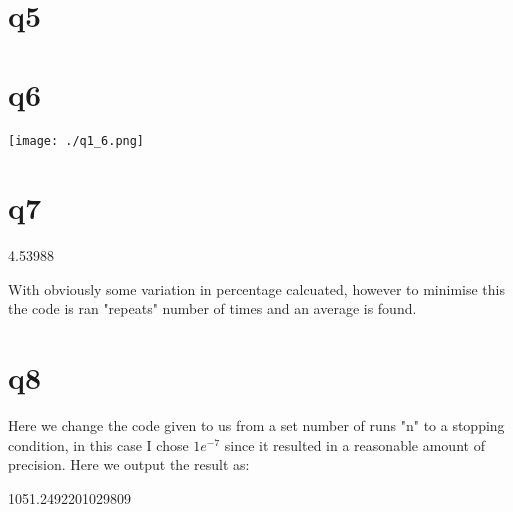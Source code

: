 \documentclass[a4paper,english]{article}
\begin{document}
    \section{q5}
    
    \section{q6}
    
    \texttt{[image: ./q1\_6.png]}
    \section{q7}
    
    \begin{code}
        4.53988%
    \end{code}
    With obviously some variation in percentage calcuated, however to minimise this the code is ran "repeats" number of times and an average is found.
    \section{q8}
    
    Here we change the code given to us from a set number of runs "n" to a stopping condition, in this case I chose $1e^{-7}$ since it resulted in a reasonable amount of precision.
    Here we output the result as:
    \begin{code}
        1051.2492201029809
    \end{code}
\end{document}
